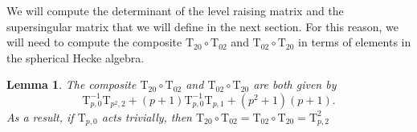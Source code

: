 \documentclass[10pt]{amsart}
\numberwithin{equation}{section}
\newtheorem{lemma}[equation]{Lemma}
\theoremstyle{definition}
\def\rmT{\mathrm{T}}
\begin{document}
We will compute the determinant of the level raising matrix and the supersingular matrix that we will define in the next section. For this reason, we will need to compute the composite $\rmT_{20}\circ\rmT_{02}$ and $\rmT_{02}\circ\rmT_{20}$ in terms of elements in the spherical Hecke algebra.
\begin{lemma}\label{T02T20}
The composite $\rmT_{20}\circ\rmT_{02}$  and $\rmT_{02}\circ\rmT_{20}$ are both given by 
\begin{equation*}
\mathrm{T}^{-1}_{p, 0}\rmT_{p^{2}, 2}+(p+1)\mathrm{T}^{-1}_{p, 0}\rmT_{p, 1}+(p^{2}+1)(p+1).
\end{equation*}
As a result, if $\rmT_{p, 0}$ acts trivially, then $\rmT_{20}\circ\rmT_{02}=\rmT_{02}\circ\rmT_{20}=\rmT^{2}_{p, 2}$
\end{lemma}
\end{document}
